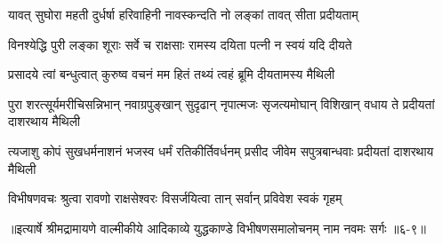 \twolineshloka
{यावत् सुघोरा महती दुर्धर्षा हरिवाहिनी}
{नावस्कन्दति नो लङ्कां तावत् सीता प्रदीयताम्} %

\twolineshloka
{विनश्येद्धि पुरी लङ्का शूराः सर्वे च राक्षसाः}
{रामस्य दयिता पत्नी न स्वयं यदि दीयते} %

\twolineshloka
{प्रसादये त्वां बन्धुत्वात् कुरुष्व वचनं मम}
{हितं तथ्यं त्वहं ब्रूमि दीयतामस्य मैथिली} %

\twolineshloka
{पुरा शरत्सूर्यमरीचिसन्निभान् नवाग्रपुङ्खान् सुदृढान् नृपात्मजः}
{सृजत्यमोघान् विशिखान् वधाय ते प्रदीयतां दाशरथाय मैथिली} %

\twolineshloka
{त्यजाशु कोपं सुखधर्मनाशनं भजस्व धर्मं रतिकीर्तिवर्धनम्}
{प्रसीद जीवेम सपुत्रबान्धवाः प्रदीयतां दाशरथाय मैथिली} %

\twolineshloka
{विभीषणवचः श्रुत्वा रावणो राक्षसेश्वरः}
{विसर्जयित्वा तान् सर्वान् प्रविवेश स्वकं गृहम्} %


॥इत्यार्षे श्रीमद्रामायणे वाल्मीकीये आदिकाव्ये युद्धकाण्डे विभीषणसमालोचनम् नाम नवमः सर्गः ॥६-९॥
